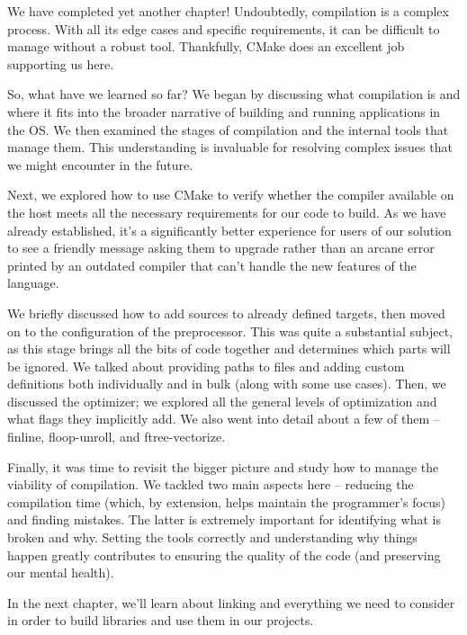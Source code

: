 We have completed yet another chapter! Undoubtedly, compilation is a complex process. With all its edge cases and specific requirements, it can be difficult to manage without a robust tool. Thankfully, CMake does an excellent job supporting us here.

So, what have we learned so far? We began by discussing what compilation is and where it fits into the broader narrative of building and running applications in the OS. We then examined the stages of compilation and the internal tools that manage them. This understanding is invaluable for resolving complex issues that we might encounter in the future.

Next, we explored how to use CMake to verify whether the compiler available on the host meets all the necessary requirements for our code to build. As we have already established, it’s a significantly better experience for users of our solution to see a friendly message asking them to upgrade rather than an arcane error printed by an outdated compiler that can’t handle the new features of the language.

We briefly discussed how to add sources to already defined targets, then moved on to the configuration of the preprocessor. This was quite a substantial subject, as this stage brings all the bits of code together and determines which parts will be ignored. We talked about providing paths to files and adding custom definitions both individually and in bulk (along with some use cases).
Then, we discussed the optimizer; we explored all the general levels of optimization and what flags they implicitly add. We also went into detail about a few of them – finline, floop-unroll, and ftree-vectorize.

Finally, it was time to revisit the bigger picture and study how to manage the viability of compilation. We tackled two main aspects here – reducing the compilation time (which, by extension, helps maintain the programmer’s focus) and finding mistakes. The latter is extremely important for identifying what is broken and why. Setting the tools correctly and understanding why things happen greatly contributes to ensuring the quality of the code (and preserving our mental health).

In the next chapter, we’ll learn about linking and everything we need to consider in order to build libraries and use them in our projects.






























